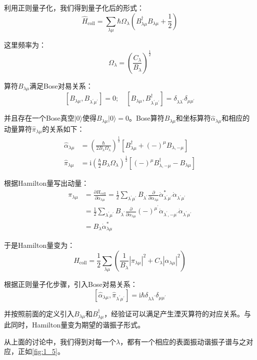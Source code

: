 利用正则量子化，我们得到量子化后的形式：
\[
\hat{H}_{\text{coll}}=\sum_{\lambda\mu}\hbar\Omega_{\lambda}\left(B^{\dagger}_{\lambda\mu}B_{\lambda\mu}+\frac{1}{2}\right)
\]

这里频率为：
\[
\Omega_{\lambda}=\left(\frac{C_{\lambda}}{B_{\lambda}}\right)^{\frac{1}{2}}
\]

算符$B_{\lambda\mu}$满足Bose对易关系：
\[
[B_{\lambda\mu},B_{\lambda^{\prime}\mu^{\prime}}]=0;\quad[B_{\lambda\mu},B^{\dagger}_{\lambda^{\prime}\mu^{\prime}}]=\delta_{\lambda\lambda^{\prime}}\delta_{\mu\mu^{\prime}}
\]

并且存在一个Bose真空$|0\rangle$使得$B_{\lambda\mu}|0\rangle=0$。Bose算符$B_{\lambda\mu}$和坐标算符$\hat{\alpha}_{\lambda\mu}$和相应的动量算符$\hat{\pi}_{\lambda\mu}$的关系如下：
\begin{align*}
\hat{\alpha}_{\lambda\mu} & =\left(\frac{\hbar}{2B_{\lambda}\Omega_{\lambda}}\right)^{\frac{1}{2}}[B^{\dagger}_{\lambda\mu}+(-)^{\mu}B_{\lambda,-\mu}]\\
\hat{\pi}_{\lambda\mu} & =\mathrm{i}\left(\frac{\hbar}{2}B_{\lambda}\Omega_{\lambda}\right)^{\frac{1}{2}}[(-)^{\mu}B^{\dagger}_{\lambda,-\mu}-B_{\lambda\mu}]
\end{align*}

\begin{booknote*}
根据Hamilton量写出动量：
\begin{align*}
\pi_{\lambda\mu} & =\frac{\partial H_{\text{coll}}}{\partial\dot{\alpha}_{\lambda\mu}}=\frac{1}{2}\sum_{\lambda^{\prime}\mu^{\prime}}B_{\lambda^{\prime}}\frac{\partial}{\partial\dot{\alpha}_{\lambda\mu}}\dot{\alpha}^{*}_{\lambda^{\prime}\mu^{\prime}}\dot{\alpha}_{\lambda^{\prime}\mu^{\prime}}\\
 & =\frac{1}{2}\sum_{\lambda^{\prime}\mu^{\prime}}B_{\lambda^{\prime}}\frac{\partial}{\partial\dot{\alpha}_{\lambda\mu}}(-)^{\mu^{\prime}}\dot{\alpha}_{\lambda^{\prime},-\mu^{\prime}}\dot{\alpha}_{\lambda^{\prime}\mu^{\prime}}\\
 & =B_{\lambda}\dot{\alpha}^{*}_{\lambda\mu}
\end{align*}

于是Hamilton量变为：
\[
H_{\text{coll}}=\frac{1}{2}\sum_{\lambda\mu}\left(\frac{1}{B_{\lambda}}\left|\pi_{\lambda\mu}\right|^{2}+C_{\lambda}\left|\alpha_{\lambda\mu}\right|^{2}\right)
\]

根据正则量子化步骤，引入Bose对易关系：
\[
[\hat{\alpha}_{\lambda\mu},\hat{\pi}_{\lambda^{\prime}\mu^{\prime}}]=\mathrm{i}\hbar\delta_{\lambda\lambda^{\prime}}\delta_{\mu\mu^{\prime}}
\]

并按照前面的定义引入$B_{\lambda\mu}$和$B^{\dagger}_{\lambda\mu}$，经验证可以满足产生湮灭算符的对应关系。与此同时，Hamilton量变为期望的谐振子形式。
\end{booknote*}
从上面的讨论中，我们得到对每一个$\lambda$，都有一个相应的表面振动谐振子谱与之对应，正如\ref{fig:1_5}。


